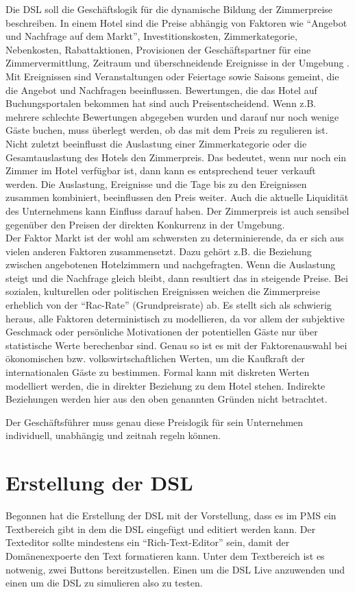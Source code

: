 \documentclass[11pt,english,ngerman, headsepline]{scrreprt}
\begin{document}
Die DSL soll die Geschäftslogik für die dynamische Bildung der Zimmerpreise
beschreiben. In einem Hotel sind die Preise abhängig von Faktoren wie
``Angebot und Nachfrage auf dem Markt'', Investitionskosten, Zimmerkategorie,
Nebenkosten, Rabattaktionen, Provisionen der Geschäftspartner für eine
Zimmervermittlung, Zeitraum und überschneidende Ereignisse in der Umgebung
\cite[S. 44]{hahn1993tourismuspsychologie}. Mit Ereignissen sind Veranstaltungen
oder Feiertage sowie Saisons gemeint, die die Angebot und Nachfragen beeinflussen. Bewertungen, die
das Hotel auf Buchungsportalen bekommen hat sind auch Preisentscheidend. Wenn
z.B. mehrere schlechte Bewertungen abgegeben wurden und darauf nur noch wenige
Gäste buchen, muss überlegt werden, ob das mit dem Preis zu regulieren ist.
Nicht zuletzt beeinflusst die Auslastung einer Zimmerkategorie oder die
Gesamtauslastung des Hotels den Zimmerpreis. Das bedeutet, wenn nur noch ein
Zimmer im Hotel verfügbar ist, dann kann es entsprechend teuer verkauft werden.
Die Auslastung, Ereignisse und die Tage bis zu den Ereignissen zusammen
kombiniert, beeinflussen den Preis weiter. Auch die aktuelle Liquidität des
Unternehmens kann Einfluss darauf haben. Der Zimmerpreis ist auch sensibel
gegenüber den Preisen der direkten Konkurrenz in der Umgebung. \\
Der Faktor Markt ist der wohl am schwersten zu determinierende, da er sich aus
vielen anderen Faktoren zusammensetzt. Dazu gehört z.B. die Beziehung zwischen
angebotenen Hotelzimmern und nachgefragten. Wenn die Auslastung steigt und die
Nachfrage gleich bleibt, dann resultiert das in steigende Preise.
Bei sozialen, kulturellen oder politischen Ereignissen weichen die Zimmerpreise
erheblich von der ``Rac-Rate'' (Grundpreisrate) ab.
Es stellt sich als schwierig heraus, alle Faktoren deterministisch zu
modellieren, da vor allem der subjektive Geschmack oder persönliche Motivationen
der potentiellen Gäste nur über statistische Werte berechenbar sind. Genau so
ist es mit der Faktorenauswahl bei ökonomischen bzw. volkswirtschaftlichen
Werten, um die Kaufkraft der internationalen Gäste zu bestimmen.
Formal kann mit diskreten Werten modelliert werden, die in direkter Beziehung zu
dem Hotel stehen. Indirekte Beziehungen werden hier aus den oben genannten
Gründen nicht betrachtet.

Der Geschäftsführer muss genau diese Preislogik für
sein Unternehmen individuell, unabhängig und zeitnah regeln können.

\section{Erstellung der DSL}\label{erstellungDSL}
Begonnen hat die Erstellung der DSL mit der Vorstellung, dass es im PMS ein
Textbereich gibt in dem die DSL eingefügt und editiert werden kann.
Der Texteditor sollte mindestens ein ``Rich-Text-Editor'' sein, damit der
Domänenexpoerte den Text formatieren kann.
Unter dem Textbereich ist es notwenig, zwei Buttons bereitzustellen. Einen um
die DSL Live anzuwenden und einen um die DSL zu simulieren also zu testen.
\end{document}
